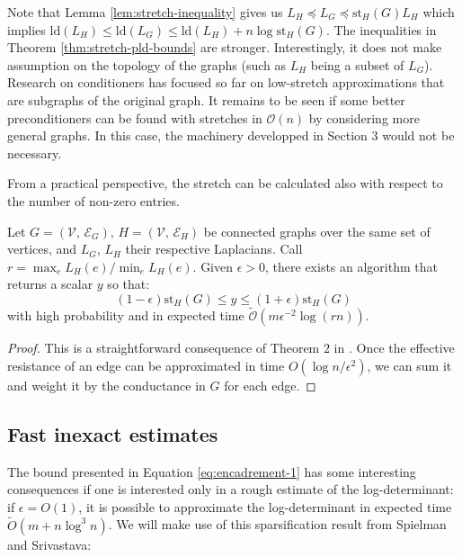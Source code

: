 Note that Lemma \ref{lem:stretch-inequality} gives us $L_{H}\preceq L_{G}\preceq\text{st}_{H}\left(G\right)L_{H}$
which implies $\text{ld}\left(L_{H}\right)\leq\text{ld}\left(L_{G}\right)\leq\text{ld}\left(L_{H}\right)+n\log\text{st}_{H}\left(G\right)$.
The inequalities in Theorem \ref{thm:stretch-pld-bounds} are stronger.
Interestingly, it does not make assumption on the topology of the
graphs (such as $L_{H}$ being a subset of $L_{G}$). Research on
conditioners has focused so far on low-stretch approximations that
are subgraphs of the original graph. It remains to be seen if some
better preconditioners can be found with stretches in $\mathcal{O}\left(n\right)$
by considering more general graphs. In this case, the machinery developped
in Section 3 would not be necessary.

From a practical perspective, the stretch can be calculated also with
respect to the number of non-zero entries.

\begin{lemma}\label{lem:stretch-approx}Let $G=\left(\mathcal{V},\,\mathcal{E}_{G}\right),\, H=\left(\mathcal{V},\,\mathcal{E}_{H}\right)$
be connected graphs over the same set of vertices, and $L_{G}$, $L_{H}$
their respective Laplacians. Call $r=\max_{e}L_{H}\left(e\right)/\min_{e}L_{H}\left(e\right)$.
Given $\epsilon>0$, there exists an algorithm that returns a scalar
$y$ so that:
\[
\left(1-\epsilon\right)\text{st}_{H}\left(G\right)\leq y\leq\left(1+\epsilon\right)\text{st}_{H}\left(G\right)
\]
with high probability and in expected time $\tilde{\mathcal{O}}\left(m\epsilon^{-2}\log\left(rn\right)\right)$.

\end{lemma}

\begin{proof}This is a straightforward consequence of Theorem $2$
in \cite{Spielman2009}. Once the effective resistance of an edge
can be approximated in time $O\left(\log n/\epsilon^{2}\right)$,
we can sum it and weight it by the conductance in $G$ for each edge.

\end{proof}


\subsection{Fast inexact estimates}

The bound presented in Equation \ref{eq:encadrement-1} has some interesting
consequences if one is interested only in a rough estimate of the
log-determinant: if $\epsilon=O\left(1\right)$, it is possible to
approximate the log-determinant in expected time $\tilde{O}\left(m+n\log^{3}n\right)$.
We will make use of this sparsification result from Spielman and Srivastava:

